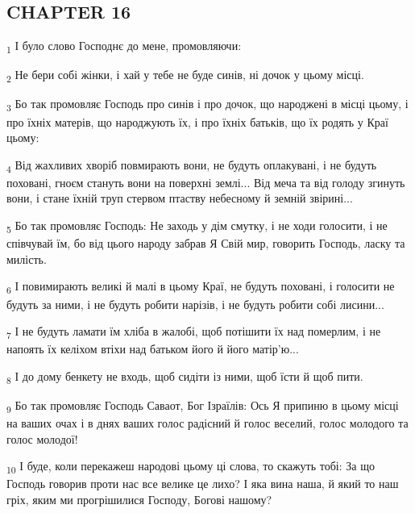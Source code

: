 \subsection{CHAPTER 16}
\begin{tcolorbox}
\textsubscript{1} І було слово Господнє до мене, промовляючи:
\end{tcolorbox}
\begin{tcolorbox}
\textsubscript{2} Не бери собі жінки, і хай у тебе не буде синів, ні дочок у цьому місці.
\end{tcolorbox}
\begin{tcolorbox}
\textsubscript{3} Бо так промовляє Господь про синів і про дочок, що народжені в місці цьому, і про їхніх матерів, що народжують їх, і про їхніх батьків, що їх родять у Краї цьому:
\end{tcolorbox}
\begin{tcolorbox}
\textsubscript{4} Від жахливих хворіб повмирають вони, не будуть оплакувані, і не будуть поховані, гноєм стануть вони на поверхні землі... Від меча та від голоду згинуть вони, і стане їхній труп стервом птаству небесному й земній звірині...
\end{tcolorbox}
\begin{tcolorbox}
\textsubscript{5} Бо так промовляє Господь: Не заходь у дім смутку, і не ходи голосити, і не співчувай їм, бо від цього народу забрав Я Свій мир, говорить Господь, ласку та милість.
\end{tcolorbox}
\begin{tcolorbox}
\textsubscript{6} І повимирають великі й малі в цьому Краї, не будуть поховані, і голосити не будуть за ними, і не будуть робити нарізів, і не будуть робити собі лисини...
\end{tcolorbox}
\begin{tcolorbox}
\textsubscript{7} І не будуть ламати їм хліба в жалобі, щоб потішити їх над померлим, і не напоять їх келіхом втіхи над батьком його й його матір'ю...
\end{tcolorbox}
\begin{tcolorbox}
\textsubscript{8} І до дому бенкету не входь, щоб сидіти із ними, щоб їсти й щоб пити.
\end{tcolorbox}
\begin{tcolorbox}
\textsubscript{9} Бо так промовляє Господь Саваот, Бог Ізраїлів: Ось Я припиню в цьому місці на ваших очах і в днях ваших голос радісний й голос веселий, голос молодого та голос молодої!
\end{tcolorbox}
\begin{tcolorbox}
\textsubscript{10} І буде, коли перекажеш народові цьому ці слова, то скажуть тобі: За що Господь говорив проти нас все велике це лихо? І яка вина наша, й який то наш гріх, яким ми прогрішилися Господу, Богові нашому?
\end{tcolorbox}
